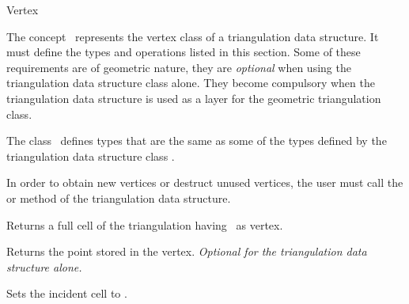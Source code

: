 
\begin{ccRefConcept}[TriangulationDataStructure::]{Vertex}


\ccDefinition
  
The concept \ccRefName\ represents the vertex class of a triangulation
data structure. It must define
the types and operations listed in this section. Some of these
requirements are of geometric nature, they are \textit{optional}
when using the triangulation data structure class alone. They become
compulsory when the triangulation data structure is used as a layer
for the geometric triangulation class.
\ccTypes
{}

The class \ccRefName\ defines types that are the same as some of the 
types defined by the triangulation data structure class
.

\ccThreeToTwo

\ccGlue
{}
\ccGlue
{}

\ccCreation
{}  %

In order to obtain new vertices or destruct unused vertices, the user must
call the  or  method of the
triangulation data structure.

\ccOperations
{}

\ccAccessFunctions

{Returns a full cell of the triangulation having \ccVar\ as vertex.}

{Returns the point stored in the vertex.
{\textit{Optional for the triangulation data structure alone.}}}


{Sets the incident cell to .}


\end{ccRefConcept}
